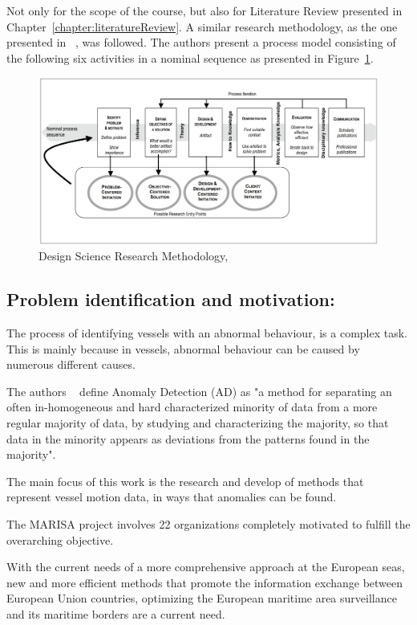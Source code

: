 Not only for the scope of the course, but also for Literature Review presented in Chapter~\ref{chapter:literatureReview}. A similar research methodology, as the one presented in ~\cite{Peffers2007}, was followed.
The authors present a process model consisting of the following six activities in a nominal sequence as presented in Figure~\ref{fig:DSRMPeffers}.

\begin{figure}[H]
	\includegraphics[width=\linewidth]{figures/DSRMPeffers.PNG}
    \caption{Design Science Research Methodology, ~\cite{Peffers2007}}
    \label{fig:DSRMPeffers}
\end{figure}

\subsection{Problem identification and motivation:} 
The process of identifying vessels with an abnormal behaviour, is a complex task. This is mainly because in vessels, abnormal behaviour can be caused by numerous different causes.
  
The authors ~\cite{Laxhammar2008} define Anomaly Detection (AD) as "a method for separating an often in-homogeneous and hard characterized minority of data from a more regular majority of data, by studying and characterizing the majority, so that data in the minority appears as deviations from the patterns found in the majority". 

The main focus of this work is the research and develop of methods that represent vessel motion data, in ways that anomalies can be found.

The MARISA project involves 22 organizations completely motivated to fulfill the overarching objective. 

With the current needs of a more comprehensive approach at the European seas, new and more efficient methods that promote the information exchange between European Union countries, optimizing the European maritime area surveillance and its maritime borders are a current need.

